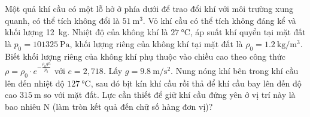 \begin{ex}
Một quả khí cầu có một lỗ hở ở phía dưới để trao đổi khí với môi trường xung quanh, có thể tích không đổi là $\SI{51}{\cubic\meter}$. Vỏ khí cầu có thể tích không đáng kể và khối lượng \SI{12}{\kilogram}. Nhiệt độ của không khí là $\SI{27}{\celsius}$, áp suất khí quyển tại mặt đất là $p_0 = \SI{101325}{\pascal}$, khối lượng riêng của không khí tại mặt đất là $\rho_0 = \SI{1,2}{\kilogram/\cubic\meter}$. Biết khối lượng riêng của không khí phụ thuộc vào chiều cao theo công thức $\rho = \rho_0 \cdot e^{-\frac{\rho_0 g h}{p_0}}$ với $e=2,718$. Lấy $g = \SI{9.8}{\meter/\second\squared}$. Nung nóng khí bên trong khí cầu lên đến nhiệt độ $\SI{127}{\celsius}$, sau đó bịt kín khí cầu rồi thả để khí cầu bay lên đến độ cao $\SI{315}{\meter}$ so với mặt đất. Lực cần thiết để giữ khí cầu đứng yên ở vị trí này là bao nhiêu \si{\newton} (làm tròn kết quả đến chữ số hàng đơn vị)?
\end{ex}
